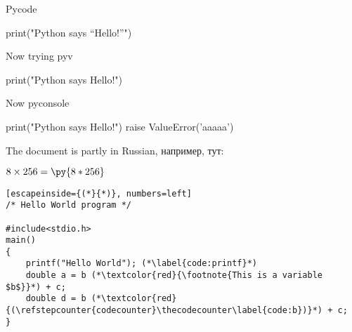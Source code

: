 \documentclass{article}
\newcommand{\pymultiply}[2]{\py{#1*#2}}
\begin{document}

\par
Pycode
\par
\begin{pycode}
print("Python says ``Hello!''")
\end{pycode}

\par
Now trying pyv
\par

\begin{pyblock}
print("Python says Hello!")
\end{pyblock}

\par
Now pyconsole
\par
\begin{pyconsole}
print("Python says Hello!")
raise ValueError('aaaaa')
\end{pyconsole}

The document is partly in Russian, например, тут:

$8 \times 256 = \pymultiply{8}{256}$


\begin{lstlisting}[escapeinside={(*}{*)}, numbers=left]
/* Hello World program */

#include<stdio.h>
main()
{
    printf("Hello World"); (*\label{code:printf}*)
    double a = b (*\textcolor{red}{\footnote{This is a variable $b$}}*) + c;
    double d = b (*\textcolor{red}{(\refstepcounter{codecounter}\thecodecounter\label{code:b})}*) + c;
}

\end{lstlisting}
\end{document}
